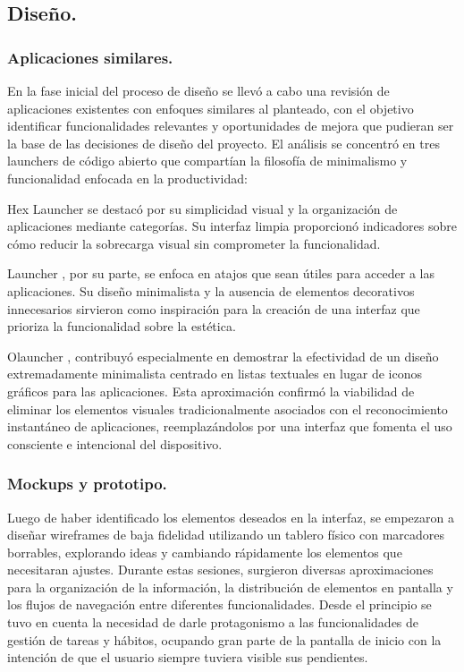 \subsection{Diseño.}

\subsubsection{Aplicaciones similares.}

En la fase inicial del proceso de diseño se llevó a cabo una revisión de aplicaciones existentes con enfoques similares al planteado, con el objetivo identificar funcionalidades relevantes y oportunidades de mejora que pudieran ser la base de las decisiones de diseño del proyecto. El análisis se concentró en tres launchers de código abierto que compartían la filosofía de minimalismo y funcionalidad enfocada en la productividad:

Hex Launcher \cite{HexLauncher} se destacó por su simplicidad visual y la organización de aplicaciones mediante categorías. Su interfaz limpia proporcionó indicadores sobre cómo reducir la sobrecarga visual sin comprometer la funcionalidad.

Launcher \cite{MinimalLauncher}, por su parte, se enfoca en atajos que sean útiles para acceder a las aplicaciones. Su diseño minimalista y la ausencia de elementos decorativos innecesarios sirvieron como inspiración para la creación de una interfaz que prioriza la funcionalidad sobre la estética.


Olauncher \cite{Olauncher}, contribuyó especialmente en demostrar la efectividad de un diseño extremadamente minimalista centrado en listas textuales en lugar de iconos gráficos para las aplicaciones. Esta aproximación confirmó la viabilidad de eliminar los elementos visuales tradicionalmente asociados con el reconocimiento instantáneo de aplicaciones, reemplazándolos por una interfaz que fomenta el uso consciente e intencional del dispositivo.

\subsubsection{Mockups y prototipo.}

Luego de haber identificado los elementos deseados en la interfaz, se empezaron a diseñar wireframes de baja fidelidad utilizando un tablero físico con marcadores borrables, explorando ideas y cambiando rápidamente los elementos que necesitaran ajustes. Durante estas sesiones, surgieron diversas aproximaciones para la organización de la información, la distribución de elementos en pantalla y los flujos de navegación entre diferentes funcionalidades. Desde el principio se tuvo en cuenta la necesidad de darle protagonismo a las funcionalidades de gestión de tareas y hábitos, ocupando gran parte de la pantalla de inicio con la intención de que el usuario siempre tuviera visible sus pendientes.

